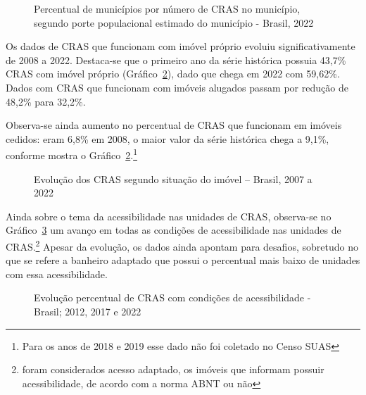 \documentclass[
  letterpaper,
  DIV=11,
  numbers=noendperiod]{scrreprt}
\begin{document}
\begin{figure}


\caption{\label{fig-CRAS-porte}Percentual de municípios por número de
CRAS no município, segundo porte populacional estimado do município -
Brasil, 2022}

\end{figure}%

Os dados de CRAS que funcionam com imóvel próprio evoluiu
significativamente de 2008 a 2022. Destaca-se que o primeiro ano da
série histórica possuia 43,7\% CRAS com imóvel próprio
(Gráfico~\ref{fig-CRAS-imovel}), dado que chega em 2022 com 59,62\%.
Dados com CRAS que funcionam com imóveis alugados passam por redução de
48,2\% para 32,2\%.

Observa-se ainda aumento no percentual de CRAS que funcionam em imóveis
cedidos: eram 6,8\% em 2008, o maior valor da série histórica chega a
9,1\%, conforme mostra o Gráfico~\ref{fig-CRAS-imovel}.\footnote{Para os
  anos de 2018 e 2019 esse dado não foi coletado no Censo SUAS}

\begin{figure}


\caption{\label{fig-CRAS-imovel}Evolução dos CRAS segundo situação do
imóvel -- Brasil, 2007 a 2022}

\end{figure}%

Ainda sobre o tema da acessibilidade nas unidades de CRAS, observa-se no
Gráfico~\ref{fig-CRAS-acessibilidade} um avanço em todas as condições de
acessibilidade nas unidades de CRAS.\footnote{foram considerados acesso
  adaptado, os imóveis que informam possuir acessibilidade, de acordo
  com a norma ABNT ou não} Apesar da evolução, os dados ainda apontam
para desafios, sobretudo no que se refere a banheiro adaptado que possui
o percentual mais baixo de unidades com essa acessibilidade.

\begin{figure}


\caption{\label{fig-CRAS-acessibilidade}Evolução percentual de CRAS com
condições de acessibilidade - Brasil; 2012, 2017 e 2022}

\end{figure}%
\end{document}

